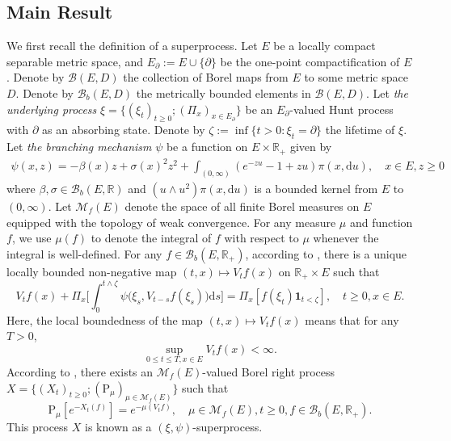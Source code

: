 \documentclass[12pt,a4paper]{amsart}
\numberwithin{equation}{section}
\theoremstyle{plain}
\theoremstyle{definition}
\theoremstyle{remark}
\begin{document}
\subsection{Main Result}\label{sec:M}
	We first recall the definition of a superprocess.
	Let $E$ be a locally compact separable metric space, and $E_\partial := E \cup \{\partial\}$ be the one-point compactification of $E$. 
	Denote by $\mathcal B(E, D)$ the collection of Borel maps  from $E$ to some metric space $D$.
	Denote by $\mathcal B_b(E,D)$ the metrically bounded elements in $\mathcal B(E,D)$.
	Let \emph{the underlying process} 
	$\xi = \{(\xi_t)_{t\ge0}; (\Pi_x)_{x\in E_\partial}\}$
	 be an $E_\partial$-valued Hunt process with $\partial$ as an absorbing state.
	Denote by $\zeta:=\inf\{t>0: \xi_t=\partial\}$ the lifetime of $\xi$.
	Let \emph{the branching mechanism} $\psi$ be a function on $E \times \mathbb R_+$ given by
\begin{align}
	\psi(x,z)
	= -\beta(x) z + \sigma(x)^2 z^2 + \int_{(0,\infty)} (e^{-zu} -1 + zu) \pi(x,{\mathrm d}u),
	\quad x\in E, z\geq 0
\end{align}
	where $\beta, \sigma \in \mathcal B_b(E,\mathbb R)$ and $(u \wedge u^2) \pi(x,{\mathrm d}u)$ is a bounded kernel from $E$ to $(0,\infty)$.
	Let $\mathcal M_f(E)$ denote the space of all finite Borel measures on $E$ equipped with the topology of weak convergence.
		For any measure $\mu$ and function $f$, we use $\mu(f)$ to denote the integral of $f$ with respect to $\mu$ whenever the integral is well-defined.
		For any $f \in \mathcal B_b(E,\mathbb R_+)$, according to \cite[Proposition 2.20]{Li2011Measure-valued}, there is a unique locally bounded non-negative map $(t,x)\mapsto V_tf(x)$ on $\mathbb R_+\times E$ such that
\begin{equation} \label{eq:M.1}
	V_tf(x) + \Pi_x\Big[\int_0^{t\wedge \zeta} \psi\big(\xi_s, V_{t-s} f(\xi_s)\big) {\mathrm d}s\Big] = \Pi_x[f(\xi_t) \mathbf 1_{t< \zeta}], \quad t\geq 0, x\in E.
\end{equation}
	Here, the local boundedness of the map $(t,x) \mapsto V_tf(x)$ means that for any $T>0$,
\[
	\sup_{0\leq t\leq T, x\in E} V_tf(x) < \infty.
\]
	According to \cite[Proposition 2.21 and Theorem 5.12]{Li2011Measure-valued}, there exists 
	an $\mathcal M_f(E)$-valued 
	Borel right process 
		  $X =\{(X_t)_{t\geq 0}; (\mathrm P_\mu)_{\mu \in \mathcal M_f(E)}\}$ such that
	\begin{equation} \label{eq:M.13}
	\mathrm P_\mu[e^{- X_t(f)}]
	= e^{- \mu(V_tf)},
	\quad \mu\in \mathcal M_f(E), t\geq 0, f \in \mathcal B_b(E,\mathbb R_+).
\end{equation}
	This process $X$ is known as a $(\xi, \psi)$-superprocess.
	
\end{document}
